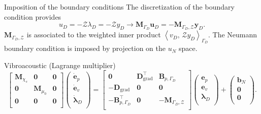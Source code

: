 \documentclass[aspectratio=169]{ISAE-Beamer}
\DeclareMathOperator*{\grad}{grad}
\newcommand{\inner}[3][]{\ensuremath{\left\langle #2, \, #3 \right\rangle_{#1}}}
\begin{document}
\begin{frame}{Imposition of the boundary conditions}
The discretization of the boundary condition provides
\[ u_D=-\mathcal{Z}\lambda_D=-\mathcal{Z}y_D \longrightarrow \mathbf{M}_{\Gamma_D} \mathbf{u}_D = - \mathbf{M}_{\Gamma_D, \mathcal{Z}} {\mathbf{y}}_D.
\]
$\mathbf{M}_{\Gamma_D, \mathcal{Z}}$ is associated to the weighted inner product $\inner[\Gamma_D]{v_D}{\mathcal{Z} y_D}$. The Neumann boundary condition is imposed by projection on the $u_N$ space.   

\begin{block}{Vibroacoustic (Lagrange multiplier)}
\begin{equation*}
\begin{bmatrix}
\mathbf{M}_{\chi_s} & \mathbf{0} & \mathbf{0}\\
\mathbf{0} & \mathbf{M}_{\mu_0} & \mathbf{0} \\
\mathbf{0} & \mathbf{0} & \mathbf{0} \\
\end{bmatrix}
\begin{pmatrix}
\dot{\mathbf{e}}_p\\
\dot{\mathbf{e}}_v\\
\dot{\bm{\lambda}}_D \\
\end{pmatrix}
= \begin{bmatrix}
\mathbf{0} & \mathbf{D}_{\grad}^\top & \mathbf{B}_{p, \Gamma_D}\\
-\mathbf{D}_{\grad} & \mathbf{0} & \mathbf{0} \\
-\mathbf{B}_{p, \Gamma_D}^\top & \mathbf{0} & -\mathbf{M}_{\Gamma_D, \mathcal{Z}} \\
\end{bmatrix}
\begin{pmatrix}
{\mathbf{e}}_p\\
{\mathbf{e}}_v\\
{\bm{\lambda}}_D \\
\end{pmatrix} + \begin{pmatrix}
\mathbf{b}_N \\
\mathbf{0}\\
\mathbf{0}\\
\end{pmatrix}.
\end{equation*}
\end{block}



\end{frame}
\end{document}
